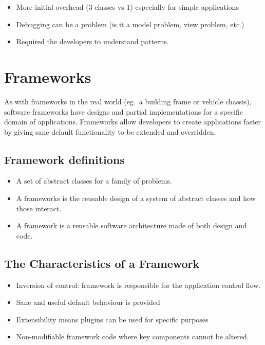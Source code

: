 \begin{itemize}
	\item More initial overhead (\(3\) classes vs \(1\)) especially for simple applications
	\item Debugging can be a problem (is it a model problem, view problem, etc.)
	\item Required the developers to understand patterns.
\end{itemize}

\section{Frameworks}\label{sec:frameworks}

As with frameworks in the real world (eg.\ a building frame or vehicle chassis), software frameworks have designs and partial implementations for a specific domain of applications.
Frameworks allow developers to create applications faster by giving sane default functionality to be extended and overridden.

\subsection{Framework definitions}\label{sub:framework_definitions}

\begin{itemize}
	\item A set of abstract classes for a family of problems.
	\item A frameworks is the reusable design of a system of abstract classes and how those interact.
	\item A framework is a reusable software architecture made of both design and code.
\end{itemize}

\subsection{The Characteristics of a Framework}\label{sub:characteristics}

\begin{itemize}
	\item Inversion of control: framework is responsible for the application control flow.
	\item Sane and useful default behaviour is provided
	\item Extensibility means plugins can be used for specific purposes
	\item Non-modifiable framework code where key components cannot be altered.
\end{itemize}

